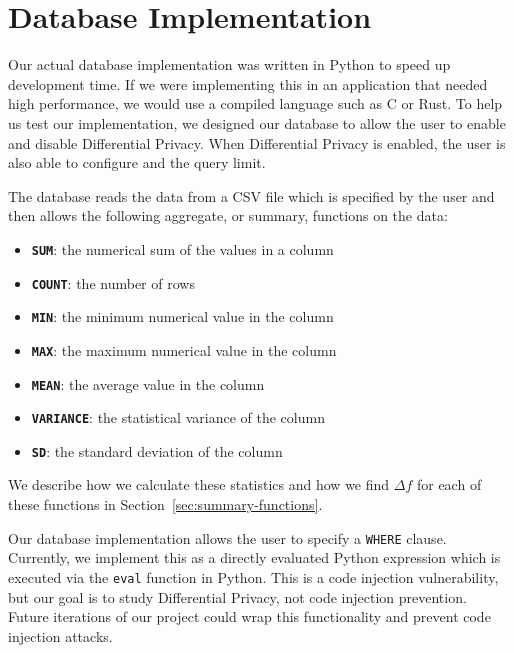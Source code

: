 \documentclass[conference,11pt]{IEEEtran}
\begin{document}
\section{Database Implementation}\label{sec:db-impl}
Our actual database implementation was written in Python to speed up development
time. If we were implementing this in an application that needed high
performance, we would use a compiled language such as C or Rust.  To help us
test our implementation, we designed our database to allow the user to enable and 
disable Differential Privacy. When Differential Privacy is enabled, the user is also
able to configure {\textepsilon} and the query limit.

The database reads the data from a CSV file which is specified by the user and
then allows the following aggregate, or summary, functions on the data:
\begin{itemize}
    \item \textbf{\texttt{SUM}}: the numerical sum of the values in a column
    \item \textbf{\texttt{COUNT}}: the number of rows
    \item \textbf{\texttt{MIN}}: the minimum numerical value in the column
    \item \textbf{\texttt{MAX}}: the maximum numerical value in the column
    \item \textbf{\texttt{MEAN}}: the average value in the column
    \item \textbf{\texttt{VARIANCE}}: the statistical variance of the column
    \item \textbf{\texttt{SD}}: the standard deviation of the column
\end{itemize}

We describe how we calculate these statistics and how we find $\Delta f$ for
each of these functions in Section~\ref{sec:summary-functions}.

Our database implementation allows the user to specify a \texttt{WHERE} clause.
Currently, we implement this as a directly evaluated Python expression which is
executed via the \texttt{eval} function in Python. This is a code injection
vulnerability, but our goal is to study Differential Privacy, not code injection
prevention. Future iterations of our project could wrap this functionality and
prevent code injection attacks.
\end{document}
